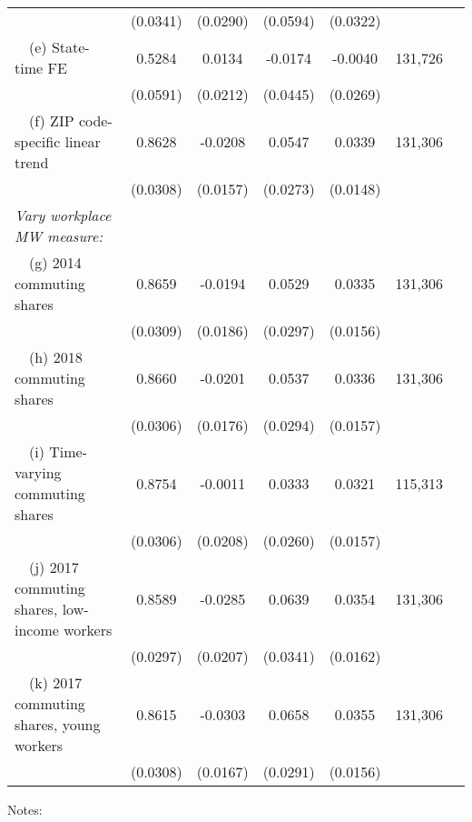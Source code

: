 \begin{table}
\begin{tabular}{@{}lcccccc@{}}
                                                             & (0.0341) & (0.0290) & (0.0594) & (0.0322) &      \\
        $\quad$(e) State-time FE                             &  0.5284  &  0.0134  &  -0.0174  &  -0.0040  & 131,726 \\
                                                             & (0.0591) & (0.0212) & (0.0445) & (0.0269) &      \\
        $\quad$(f) ZIP code-specific linear trend            &  0.8628  &  -0.0208  &  0.0547  &  0.0339  & 131,306 \\
                                                             & (0.0308) & (0.0157) & (0.0273) & (0.0148) &      \\
        \textit{Vary workplace MW measure:}                  &       &       &       &       &      \\
        $\quad$(g) 2014 commuting shares                     &  0.8659  &  -0.0194  &  0.0529  &  0.0335  & 131,306 \\
                                                             & (0.0309) & (0.0186) & (0.0297) & (0.0156) &      \\
        $\quad$(h) 2018 commuting shares                     &  0.8660  &  -0.0201  &  0.0537  &  0.0336  & 131,306 \\
                                                             & (0.0306) & (0.0176) & (0.0294) & (0.0157) &      \\
        $\quad$(i) Time-varying commuting shares             &  0.8754  &  -0.0011  &  0.0333  &  0.0321  & 115,313 \\
                                                             & (0.0306) & (0.0208) & (0.0260) & (0.0157) &      \\
        $\quad$(j) 2017 commuting shares, low-income workers &  0.8589  &  -0.0285  &  0.0639  &  0.0354  & 131,306 \\
                                                             & (0.0297) & (0.0207) & (0.0341) & (0.0162) &      \\
        $\quad$(k) 2017 commuting shares, young workers      &  0.8615  &  -0.0303  &  0.0658  &  0.0355  & 131,306 \\
                                                             & (0.0308) & (0.0167) & (0.0291) & (0.0156) &      \\ \bottomrule
    \end{tabular}

    \begin{minipage}{.95\textwidth} \footnotesize
        \vspace{2mm}
        Notes: 
        
    \end{minipage}
\end{table}
